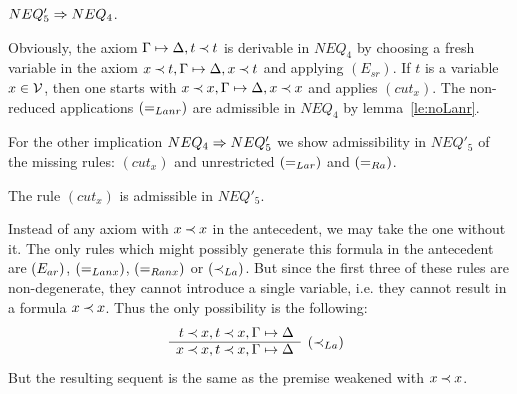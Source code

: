 %
\begin{LEMMA}\label{le:neq5toneq4}
$NEQ'_5\mathrel\Rightarrow NEQ_4$.
\end{LEMMA}
\begin{PROOF}
Obviously, the axiom $\Gamma\mathrel{\mapsto}\Delta, t\mathbin{\prec} t$ is derivable in $NEQ_4$ by choosing a fresh
variable in the axiom $x\mathbin{\prec} t,\Gamma\mathrel{\mapsto}\Delta, x\mathbin{\prec} t$ and applying $(E_{sr})$. 
If $t$ is a variable $x\in{\cal V}$,
then one starts with $x\mathbin{\prec} x,\Gamma\mathrel{\mapsto}\Delta, x\mathbin{\prec} x$ and applies $(cut_x)$.
The non-reduced applications $(=_{Lanr})$ are admissible in $NEQ_4$ by lemma~\ref{le:noLanr}.
\end{PROOF}

\noindent
For the other implication $NEQ_4\mathrel\Rightarrow NEQ'_5$ we show admissibility in $NEQ'_5$
of the missing rules: %
$(cut_x)$ %
and unrestricted $(=_{Lar})$ and $(=_{Ra})$.

\begin{LEMMA}\label{le:noxeq}
The rule $(cut_x)$ is admissible in $NEQ'_5$.
\end{LEMMA}
\begin{PROOF}
Instead of any axiom with $x\mathbin{\prec} x$ in the antecedent, we may
take the one without it. The only rules which might possibly generate this formula in the
antecedent are $(E_{ar})$, $(=_{Lanx})$, $(=_{Ranx})$ or $(\mathbin{\prec}_{La})$. 
But since the first three of these rules are non-degenerate, they cannot introduce 
a single variable, 
i.e. they cannot result in a formula $x\mathbin{\prec} x$. Thus the only possibility is the
following:
\[\prar{t\Incl x, t\Incl x, \GSD \cl
x\Incl x, t\Incl x, \GSD & \rabove{\iLa}
}
\]
But the resulting sequent is the same as the premise weakened with $x\mathbin{\prec} x$.
\end{PROOF}

